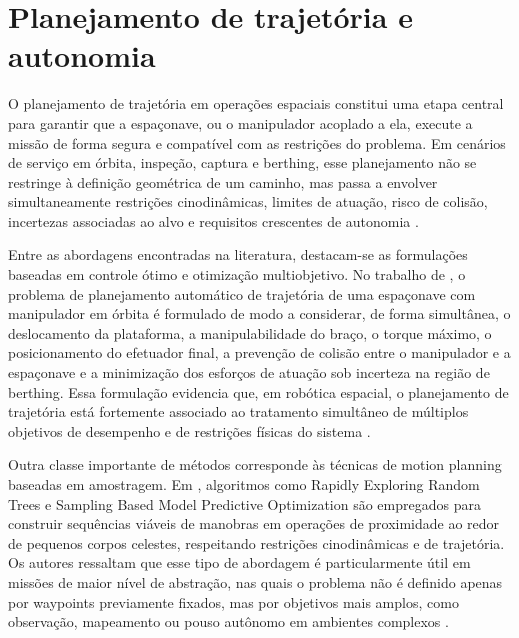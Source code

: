 \section{Planejamento de trajetória e autonomia}

O planejamento de trajetória em operações espaciais constitui uma etapa central para garantir que a espaçonave, ou o manipulador acoplado a ela, execute a missão de forma segura e compatível com as restrições do problema. Em cenários de serviço em órbita, inspeção, captura e berthing, esse planejamento não se restringe à definição geométrica de um caminho, mas passa a envolver simultaneamente restrições cinodinâmicas, limites de atuação, risco de colisão, incertezas associadas ao alvo e requisitos crescentes de autonomia \cite{santos2022machine,capolupo2017heuristic,fiori2024modeling}.

Entre as abordagens encontradas na literatura, destacam-se as formulações baseadas em controle ótimo e otimização multiobjetivo. No trabalho de \cite{santos2022machine}, o problema de planejamento automático de trajetória de uma espaçonave com manipulador em órbita é formulado de modo a considerar, de forma simultânea, o deslocamento da plataforma, a manipulabilidade do braço, o torque máximo, o posicionamento do efetuador final, a prevenção de colisão entre o manipulador e a espaçonave e a minimização dos esforços de atuação sob incerteza na região de berthing. Essa formulação evidencia que, em robótica espacial, o planejamento de trajetória está fortemente associado ao tratamento simultâneo de múltiplos objetivos de desempenho e de restrições físicas do sistema \cite{santos2022machine}.

Outra classe importante de métodos corresponde às técnicas de motion planning baseadas em amostragem. Em \cite{capolupo2017heuristic}, algoritmos como Rapidly Exploring Random Trees e Sampling Based Model Predictive Optimization são empregados para construir sequências viáveis de manobras em operações de proximidade ao redor de pequenos corpos celestes, respeitando restrições cinodinâmicas e de trajetória. Os autores ressaltam que esse tipo de abordagem é particularmente útil em missões de maior nível de abstração, nas quais o problema não é definido apenas por waypoints previamente fixados, mas por objetivos mais amplos, como observação, mapeamento ou pouso autônomo em ambientes complexos \cite{capolupo2017heuristic}.

